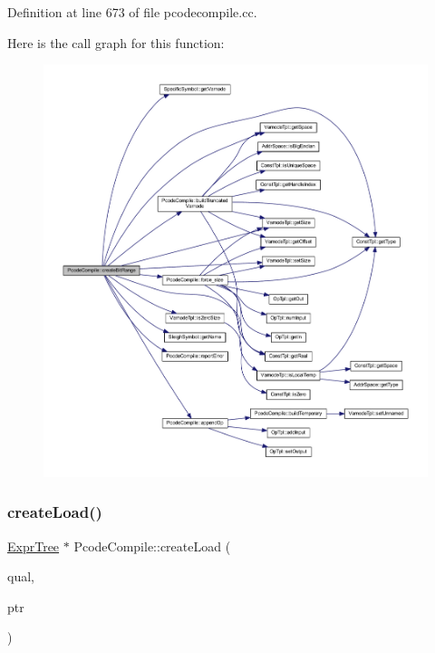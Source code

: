 Definition at line 673 of file pcodecompile.\+cc.

Here is the call graph for this function\+:
\nopagebreak
\begin{figure}[H]
\begin{center}
\leavevmode
\includegraphics[width=350pt]{class_pcode_compile_a0f46346dc8f300f3ae8fe0b0f7b65e79_cgraph}
\end{center}
\end{figure}
\mbox{\label{class_pcode_compile_a1731825ce7ddacbdfacb59416a3876c1}} 
\subsubsection{\texorpdfstring{createLoad()}{createLoad()}}
{\footnotesize\ttfamily \mbox{\hyperlink{class_expr_tree}{Expr\+Tree}} $\ast$ Pcode\+Compile\+::create\+Load (\begin{DoxyParamCaption}\item[{\mbox{\hyperlink{struct_star_quality}{Star\+Quality}} $\ast$}]{qual,  }\item[{\mbox{\hyperlink{class_expr_tree}{Expr\+Tree}} $\ast$}]{ptr }\end{DoxyParamCaption})}



